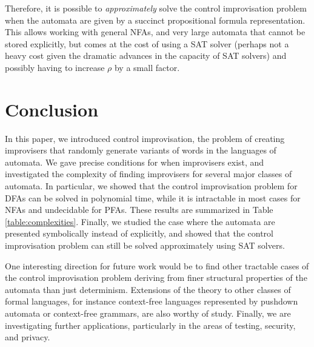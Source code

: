 \documentclass[a4paper,USenglish,numberwithinsect]{lipics}
\theoremstyle{plain}
\theoremstyle{definition}
\begin{document}
Therefore, it is possible to {\em approximately} solve the control
improvisation problem when the automata are given by a succinct
propositional formula representation. This allows working with general
NFAs, and very large automata that cannot be stored explicitly, but
comes at the cost of using a SAT solver (perhaps not a heavy cost
given the dramatic advances in the capacity of SAT solvers) and
possibly having to increase $\rho$ by a small factor. 

\section{Conclusion} \label{section:conclusion}

In this paper, we introduced control improvisation, the problem of
creating improvisers that randomly generate variants of words in the
languages of automata. We gave precise conditions for when improvisers
exist, and investigated the complexity of finding improvisers for
several major classes of automata. In particular, we showed that the
control improvisation problem for DFAs can be solved in polynomial
time, while it is intractable in most cases for NFAs and undecidable 
for PFAs. These results are summarized in Table
\ref{table:complexities}. Finally, we studied the case where the
automata are presented symbolically instead of explicitly, and showed
that the control improvisation problem can still be solved
approximately using SAT solvers. 

One interesting direction for future
work would be to find other tractable cases of the control
improvisation problem deriving from finer structural properties of the
automata than just determinism. Extensions of the theory to other classes of
formal languages, for instance context-free languages represented by 
pushdown automata or context-free grammars, are also worthy of study. 
Finally, we are investigating
further applications, particularly in the areas of testing, security,
and privacy. 
\end{document}
